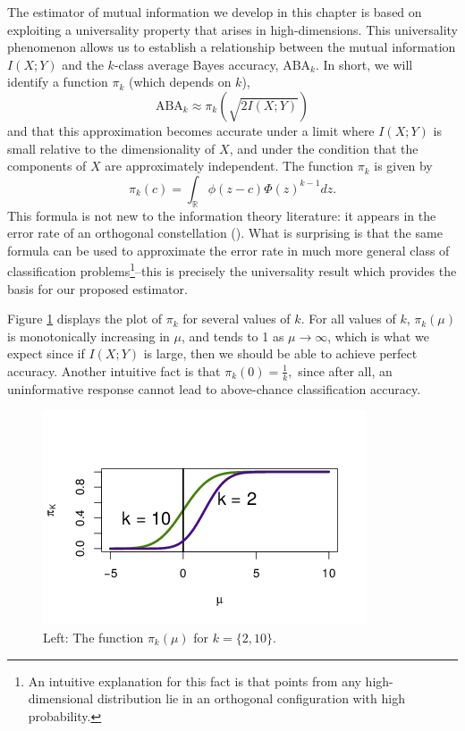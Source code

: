 The estimator of mutual information we develop in this chapter is
based on exploiting a universality property that arises in
high-dimensions.  This universality phenomenon allows us to establish
a relationship between the mutual information $I(X; Y)$ and the
$k$-class average Bayes accuracy, $\text{ABA}_k$.  In short, we will
identify a function $\pi_k$ (which depends on $k$),
\begin{equation}\label{abepi}
\text{ABA}_k \approx \pi_k(\sqrt{2 I(X; Y)})
\end{equation}
and that this approximation becomes accurate under a limit where $I(X;
Y)$ is small relative to the dimensionality of $X$, and under the
condition that the components of $X$ are approximately independent.
The function $\pi_k$ is given by
\[
\pi_k(c) = \int_{\mathbb{R}} \phi(z - c)  \Phi(z)^{k-1} dz.
\]
This formula is not new to the information theory literature: it
appears in the error rate of an orthogonal constellation (\cite{cioffi2014}).  What
is surprising is that the same formula can be used to approximate the
error rate in much more general class of classification
problems\footnote{An intuitive explanation for this fact is that
  points from any high-dimensional distribution lie in an orthogonal
  configuration with high probability.}--this is precisely the
universality result which provides the basis for our proposed
estimator.

Figure \ref{fig:pi} displays the plot of $\pi_k$ for several values of
$k$.  For all values of $k$, $\pi_k(\mu)$ is monotonically increasing
in $\mu$, and tends to 1 as $\mu \to \infty$, which is what we expect
since if $I(X; Y)$ is large, then we should be able to achieve perfect
accuracy.  Another intuitive fact is that $ \pi_k(0) = \frac{1}{k}, $
since after all, an uninformative response cannot lead to above-chance
classification accuracy.


\begin{figure}
\centering
\includegraphics[scale = 0.7, clip=true, trim=0 0.2in 0 0.5in]{Figures/illus_piK_flat_flipped.png}
\caption{Left: The function $\pi_k(\mu)$ for $k = \{2, 10\}$.}
\label{fig:pi}
\end{figure}

